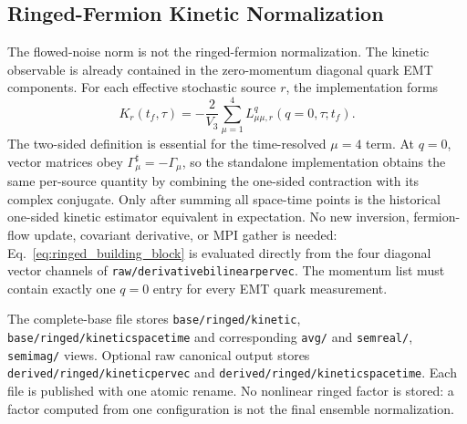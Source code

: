 \documentclass[11pt,a4paper]{article}
\newcommand{\code}[1]{\texttt{\begingroup\def\_{\textunderscore\allowbreak}#1\endgroup}}
\newcommand{\Vthree}{V_3}
\newcommand{\Tf}{t_f}
\begin{document}
\subsection{Ringed-Fermion Kinetic Normalization}

The flowed-noise norm is not the ringed-fermion normalization.  The kinetic
observable is already contained in the
zero-momentum diagonal quark EMT components.  For each effective stochastic
source \(r\), the implementation forms
\begin{equation}
  K_r(\Tf,\tau)
  =-\frac{2}{\Vthree}\sum_{\mu=1}^{4}
  L^q_{\mu\mu,r}(q=0,\tau;\Tf).
  \label{eq:ringed_building_block}
\end{equation}
The two-sided definition is essential for the time-resolved \(\mu=4\) term.
At \(q=0\), vector matrices obey \(\Gamma_\mu^\sharp=-\Gamma_\mu\), so the
standalone implementation obtains the same per-source quantity by combining
the one-sided contraction with its complex conjugate.  Only after summing all
space-time points is the historical one-sided kinetic estimator equivalent in
expectation.
No new inversion, fermion-flow update, covariant derivative, or MPI gather is
needed: Eq.~\eqref{eq:ringed_building_block} is evaluated directly from the
four diagonal vector channels of
\code{raw/derivative\_bilinear\_pervec}.  The momentum list must contain
exactly one \(q=0\) entry for every EMT quark measurement.

The complete-base file stores \code{base/ringed/kinetic},
\code{base/ringed/kinetic\_spacetime} and corresponding \code{avg/} and
\code{sem\_real/}, \code{sem\_imag/} views. Optional raw canonical output
stores \code{derived/ringed/kinetic\_pervec} and
\code{derived/ringed/kinetic\_spacetime}. Each file is published with one
atomic rename. No nonlinear ringed factor is stored: a factor computed from
one configuration is not the final ensemble normalization.
\end{document}
